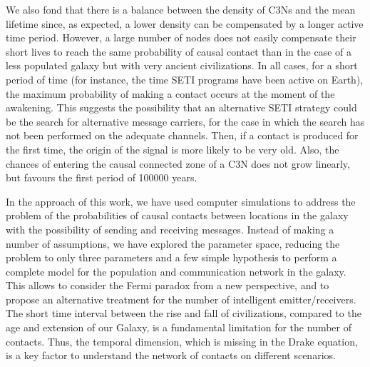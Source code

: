 \documentclass[crop]{CSLB}
\newcommand{\ceti}{C3N}
\newcommand{\cetis}{C3Ns}
\begin{document}
We also fond that there 
is a balance between the density of \cetis{} and the mean
lifetime since, as expected, a lower density can be compensated by a
longer active time period.
%
However, a large number of nodes does not easily compensate their
short lives to reach the same probability of causal contact than in
the case of a less populated galaxy but with very ancient
civilizations.
%
In all cases, for a short period of time (for instance, the time SETI
programs have been active on Earth), the maximum probability of making
a contact occurs at the moment of the awakening.
%
This suggests the possibility that an alternative SETI strategy could
be the search for alternative message carriers, for the case in which
the search has not been performed on the adequate channels.
%
Then, if a contact is produced for the first time, the origin of the
signal is more likely to be very old.
%
Also, the chances of entering the causal connected zone of a \ceti{}
does not grow linearly, but favours the first period of 100000 years.


In the approach of this work, we have used computer simulations to address
the problem of the probabilities of causal contacts between locations
in the galaxy with the possibility of sending and receiving messages.
%
Instead of making a number of assumptions, we have explored the
parameter space, reducing the problem to only three parameters and a
few simple hypothesis to perform a complete model for the population and
communication network in the galaxy.
%
This allows to consider the Fermi paradox from a new perspective, and
to propose an alternative treatment for the number of intelligent
emitter/receivers.
%
The short time interval between the
rise and fall of civilizations, compared to the age and extension of
our Galaxy, is a fundamental limitation for the number of contacts.
%
Thus, the temporal dimension, which is missing in the Drake
equation, is a key factor to understand the network of contacts on
different scenarios.


\end{document}

